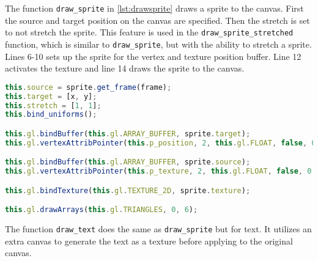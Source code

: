 The function \texttt{draw\_sprite} in \autoref{lst:drawsprite} draws a sprite to the canvas.
First the source and target position on the canvas are specified.
Then the stretch is set to not stretch the sprite.
This feature is used in the \texttt{draw\_sprite\_stretched} function, which is similar to \texttt{draw\_sprite}, but with the ability to stretch a sprite.
Lines 6-10 sets up the sprite for the vertex and texture position buffer.
Line 12 activates the texture and line 14 draws the sprite to the canvas.

\begin{lstlisting}[language=JavaScript, caption=The function \texttt{draw\_sprite}, label=lst:drawsprite]
this.source = sprite.get_frame(frame);
this.target = [x, y];
this.stretch = [1, 1];
this.bind_uniforms();

this.gl.bindBuffer(this.gl.ARRAY_BUFFER, sprite.target);
this.gl.vertexAttribPointer(this.p_position, 2, this.gl.FLOAT, false, 0, 0);

this.gl.bindBuffer(this.gl.ARRAY_BUFFER, sprite.source);
this.gl.vertexAttribPointer(this.p_texture, 2, this.gl.FLOAT, false, 0, 0);

this.gl.bindTexture(this.gl.TEXTURE_2D, sprite.texture);

this.gl.drawArrays(this.gl.TRIANGLES, 0, 6);
\end{lstlisting}

The function \texttt{draw\_text} does the same as \texttt{draw\_sprite} but for text. It utilizes an extra canvas to generate the text as a texture before applying to the original canvas.
